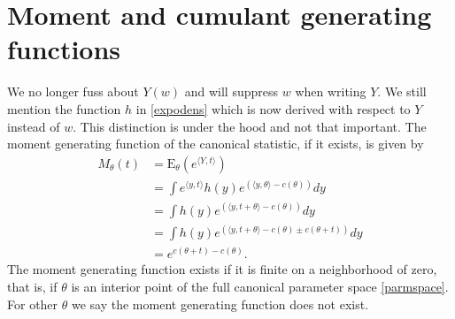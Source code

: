 \documentclass[12pt]{article}
\newcommand{\E}{\mathrm{E}}
\newcommand{\inner}[1]{\langle #1 \rangle}
\DeclareMathOperator{\E}{E}
\begin{document}
\section*{Moment and cumulant generating functions}
We no longer fuss about $Y(w)$ and will suppress $w$ when writing $Y$. We still mention the function $h$ in \eqref{expodens} which is now derived with respect to $Y$ instead of $w$. This distinction is under the hood and not that important. The moment generating function of the canonical statistic, if it exists, is given by 
\begin{equation} \label{mgf}
\begin{split}
	M_\theta(t) &= \E_\theta\left(e^{\inner{Y, t}}\right) \\
	  &= \int e^{\inner{y, t}} h(y)e^{\left(\inner{y, \theta} - c(\theta)\right)} dy \\
	  &= \int h(y)e^{\left(\inner{y, t + \theta} - c(\theta)\right)}dy \\
	  &= \int h(y)e^{\left(\inner{y, t + \theta} - c(\theta) \pm c(\theta + t)\right)}dy \\
	  &= e^{c(\theta + t) - c(\theta)}.
\end{split}
\end{equation}
The moment generating function exists if it is finite on a neighborhood of zero, that is, if $\theta$ is an interior point of the full canonical parameter space \eqref{parmspace}. For other $\theta$ we say the moment generating function does not exist.
\end{document}
